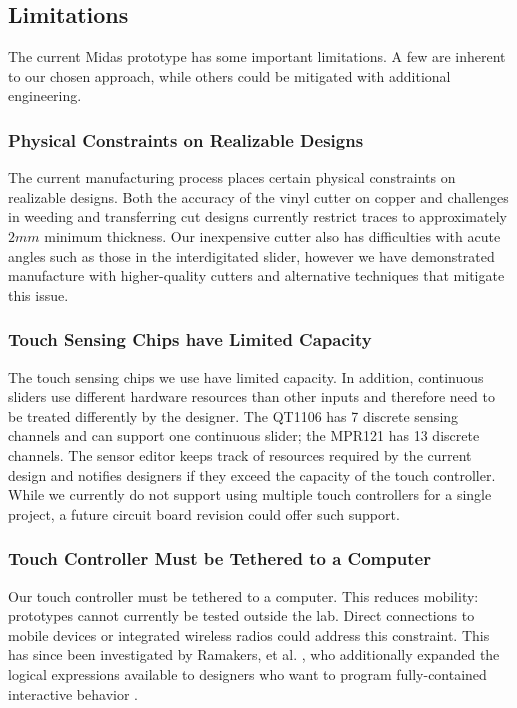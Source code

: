     \subsection{Limitations}
    
    The current Midas prototype has some important limitations. A few are inherent to our chosen approach, while others could be mitigated with additional engineering.

\subsubsection{Physical Constraints on Realizable Designs}
The current manufacturing process places certain physical constraints on realizable designs. Both the accuracy of the vinyl cutter on copper and challenges in weeding and transferring cut designs currently restrict traces to approximately $2mm$ minimum thickness. Our inexpensive cutter also has difficulties with acute angles such as those in the interdigitated slider, however we have demonstrated manufacture with higher-quality cutters and alternative techniques that mitigate this issue.

\subsubsection{Touch Sensing Chips have Limited Capacity}
The touch sensing chips we use have limited capacity. In addition, continuous sliders use different hardware resources than other inputs and therefore need to be treated differently by the designer. The QT1106 has 7 discrete sensing channels and can support one continuous slider; the MPR121 has 13 discrete channels. The sensor editor keeps track of resources required by the current design and notifies designers if they exceed the capacity of the touch controller. While we currently do not support using multiple touch controllers for a single project, a future circuit board revision could offer such support. 

\subsubsection{Touch Controller Must be Tethered to a Computer}
Our touch controller must be tethered to a computer. This reduces mobility: prototypes cannot currently be tested outside the lab. Direct connections to mobile devices or integrated wireless radios could address this constraint. This has since been investigated by Ramakers, et al. \cite{ramakers-paperpulse}, who additionally expanded the logical expressions available to designers who want to program fully-contained interactive behavior .

